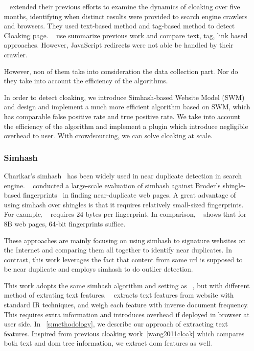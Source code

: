  ~\cite{wang2011cloak}
 extended their previous efforts to examine the dynamics of cloaking over five
 months, identifying when distinct results were provided to search engine
 crawlers and browsers.
They used text-based method and tag-based method to detect Cloaking page.
 ~\cite{deng2013uncovering} use summarize previous work and compare text, tag,
 link based approaches. However, JavaScript redirects were not able be handled by their crawler.

However, non of them take into consideration the data collection part. Nor do
they take into account the efficiency of the algorithms.

In order to detect cloaking, we introduce Simhash-based Website Model (SWM) and
design and implement a much more efficient algorithm based on SWM, which has
comparable false positive rate and true positive rate. We take into account the
efficiency of the algorithm and implement a plugin which introduce negligible
overhead to user. With crowdsourcing, we can solve cloaking at scale.


\subsubsection{Simhash}
Charikar's simhash~\cite{charikar2002similarity} has been widely used in near
duplicate detection in search engine. ~\cite{henzinger2006finding}
conducted a large-scale evaluation of simhash against Broder's shingle-based
fingerprints~\cite{broder1997syntactic} in finding near-duplicate web pages.
A great advantage of using simhash over shingles is that it
requires relatively small-sized fingerprints.
For example, ~\cite{broder1997syntactic} requires 24 bytes per fingerprint.
In comparison, ~\cite{manku2007detecting} shows that for 8B web pages, 64-bit
fingerprints suffice.

These approaches are mainly focusing on using simhash to signature websites on
the Internet and comparing them all together to identify near duplicates.
In contrast, this work leverages the fact that content from same url is supposed
to be near duplicate and employs simhash to do outlier detection.

This work adopts the same simhash algorithm and setting as 
~\cite{manku2007detecting}, but with different method of extrating text
features. ~\cite{manku2007detecting} extracts text features from website with
standard IR techniques, and weigh each feature with inverse document frequency.
This requires extra information and introduces overhead if deployed in browser at user side.
In ~\autoref{s:methodology}, we describe our approach of extracting text features.
Inspired from previous cloaking work~\autoref{wang2011cloak} which compares both
text and dom tree information, we extract dom features as well.




